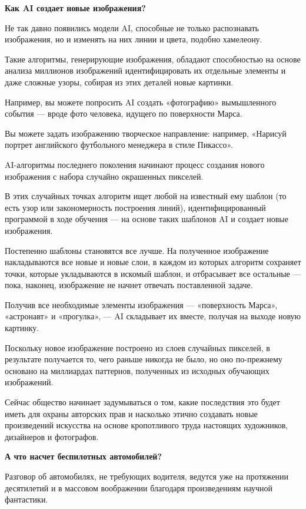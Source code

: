 \textbf{Как AI создает новые изображения?}

Не так давно появились модели AI, способные не только распознавать изображения, но и изменять на них линии и цвета, подобно хамелеону.

Такие алгоритмы, генерирующие изображения, обладают способностью на основе анализа миллионов изображений идентифицировать их отдельные элементы и даже сложные узоры, собирая из этих деталей новые картинки.

Например, вы можете попросить AI создать «фотографию» вымышленного события — вроде фото человека, идущего по поверхности Марса.

Вы можете задать изображению творческое направление: например, «Нарисуй портрет английского футбольного менеджера в стиле Пикассо».

AI-алгоритмы последнего поколения начинают процесс создания нового изображения с набора случайно окрашенных пикселей.

В этих случайных точках алгоритм ищет любой  на известный ему шаблон (то есть узор или закономерность построения линий), идентифицированный программой в ходе обучения — на основе таких шаблонов AI и создает новые изображения.

Постепенно шаблоны становятся все лучше. На полученное изображение накладываются все новые и новые слои, в каждом из которых алгоритм сохраняет точки, которые укладываются в искомый шаблон, и отбрасывает все остальные — пока, наконец, изображение не начнет отвечать поставленной задаче.

Получив все необходимые элементы изображения — «поверхность Марса», «астронавт» и «прогулка», — AI складывает их вместе, получая на выходе новую картинку.

Поскольку новое изображение построено из слоев случайных пикселей, в результате получается то, чего раньше никогда не было, но оно по-прежнему основано на миллиардах паттернов, полученных из исходных обучающих изображений.

Сейчас общество начинает задумываться о том, какие последствия это будет иметь для охраны авторских прав и насколько этично создавать новые произведений искусства на основе кропотливого труда настоящих художников, дизайнеров и фотографов.


\textbf{А что насчет беспилотных автомобилей?}

Разговор об автомобилях, не требующих водителя, ведутся уже на протяжении десятилетий и   в массовом воображении благодаря произведениям научной фантастики.

